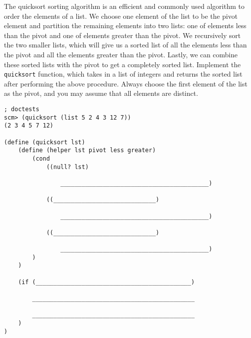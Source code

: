 \question 
The quicksort sorting algorithm is an efficient and commonly used algorithm to
order the elements of a list. We choose one element of the list to be the pivot
element and partition the remaining elements into two lists: one of elements less
than the pivot and one of elements greater than the pivot. We recursively sort the two smaller lists, which will give us a sorted list of all the elements less than the pivot and all the elements greater than the pivot. Lastly, we can combine these sorted lists with the pivot to get a completely sorted list.
\newline
\newline
Implement the \texttt{quicksort} function, which takes in a list of integers and returns the sorted list after performing the above procedure. Always choose the first element of the list as the pivot, and you may assume that all elements are distinct. 
\newline

\begin{lstlisting}
; doctests
scm> (quicksort (list 5 2 4 3 12 7))
(2 3 4 5 7 12)

(define (quicksort lst)
    (define (helper lst pivot less greater)
        (cond
            ((null? lst) 

                __________________________________________)

            ((_____________________________)

                __________________________________________)

            ((_____________________________)

                __________________________________________)
        )
    )

    (if (____________________________________________)

        ______________________________________________

        ______________________________________________
    )
)
\end{lstlisting}

